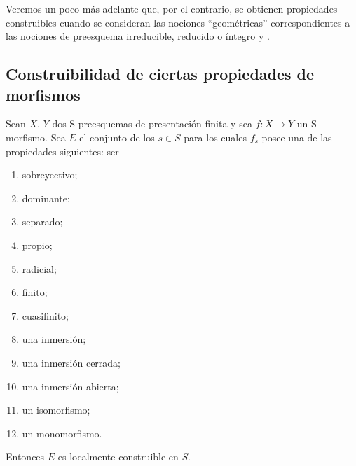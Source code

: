 \begin{remark}[9.5.7]
Veremos un poco más adelante  que, por el contrario, se obtienen propiedades construibles cuando se consideran las nociones ``geométricas'' correspondientes a las nociones de preesquema irreducible, reducido o íntegro  y .
\end{remark}

\subsection{Construibilidad de ciertas propiedades de morfismos}
\label{subsection:IV.9.6}

\begin{proposition}[9.6.1]
\label{IV.9.6.1}
Sean $X$, $Y$ dos S-preesquemas de presentación finita y sea $f:X\to Y$ un S-morfismo.
Sea $E$ el conjunto de los $s\in S$ para los cuales $f_s$ posee una de las propiedades siguientes: ser
\begin{enumerate}[label=\textup{(\roman*)},widest=xii]
  \item sobreyectivo;
  \item dominante;
  \item separado;
  \item propio;
  \item radicial;
  \item finito;
  \item cuasifinito;
  \item una inmersión;
  \item una inmersión cerrada;
  \item una inmersión abierta;
  \item un isomorfismo;
  \item un monomorfismo.
\end{enumerate}
Entonces $E$ es localmente construible en $S$.
\end{proposition}

